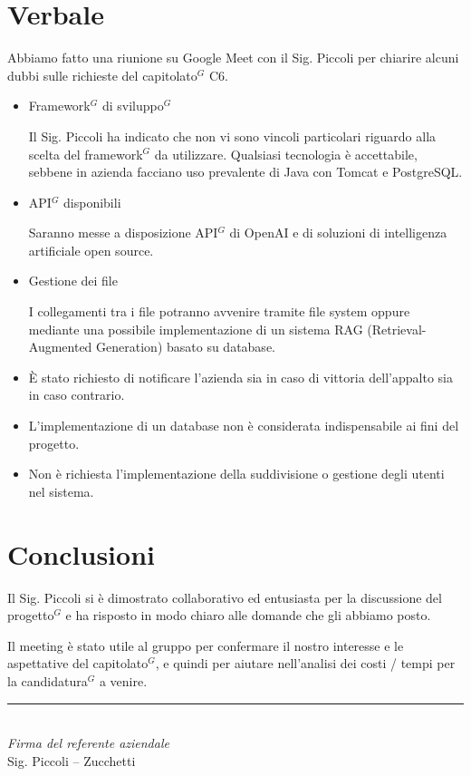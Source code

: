 \documentclass[a4paper,10pt]{article}
\begin{document}
\section*{Verbale}
Abbiamo fatto una riunione su Google Meet con il Sig. Piccoli per chiarire alcuni dubbi sulle richieste del capitolato$^G$ C6.

\vspace{1\baselineskip}

\begin{itemize}
    \item Framework$^G$ di sviluppo$^G$
    \par Il Sig. Piccoli ha indicato che non vi sono vincoli particolari riguardo alla scelta del framework$^G$ da utilizzare. Qualsiasi tecnologia è accettabile, sebbene in azienda facciano uso prevalente di Java con Tomcat e PostgreSQL.
    \item API$^G$ disponibili
    \par Saranno messe a disposizione API$^G$ di OpenAI e di soluzioni di intelligenza artificiale open source.
    \item Gestione dei file
    \par I collegamenti tra i file potranno avvenire tramite file system oppure mediante una possibile implementazione di un sistema RAG (Retrieval-Augmented Generation) basato su database.
    \item È stato richiesto di notificare l’azienda sia in caso di vittoria dell’appalto sia in caso contrario.
    \item L’implementazione di un database non è considerata indispensabile ai fini del progetto.
    \item Non è richiesta l’implementazione della suddivisione o gestione degli utenti nel sistema.
\end{itemize}

\vspace{1\baselineskip}

\section*{Conclusioni}
Il Sig. Piccoli si è dimostrato collaborativo ed entusiasta per la discussione del progetto$^G$ e ha risposto in modo chiaro alle domande che gli abbiamo posto.

\vspace{1\baselineskip}

Il meeting è stato utile al gruppo per confermare il nostro interesse e le aspettative del capitolato$^G$, e quindi per aiutare nell'analisi dei costi / tempi per la candidatura$^G$ a venire.

\vspace{2cm}
\begin{flushright}
\noindent\rule{6cm}{0.4pt}\\
\textit{Firma del referente aziendale}\\
Sig. Piccoli – Zucchetti
\end{flushright}
\end{document}
